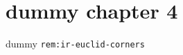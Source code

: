 \clearpage\begingroup\small
\setcounter{chapter}{4}\addtocounter{chapter}{-1}
\chapter{dummy chapter 4}
\begin{remark}\label{rem:ir-euclid-corners}dummy \texttt{rem:ir-euclid-corners}\end{remark}
\endgroup
